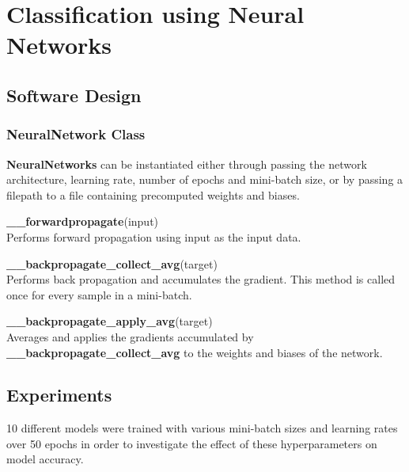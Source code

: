 \section{Classification using Neural Networks}

\subsection{Software Design}

\subsubsection*{NeuralNetwork Class}
\begin{list}{-}{}

    \item \textbf{NeuralNetworks} can be instantiated either through passing the
          network architecture, learning rate, number of epochs and mini-batch size,
          or by passing a filepath to a file containing precomputed weights and biases.

    \item \textbf{\_\_forwardpropagate}(input)\\
          Performs forward propagation using input as the input data.

    \item \textbf{\_\_backpropagate\_collect\_avg}(target)\\
          Performs back propagation and accumulates the gradient.
          This method is called once for every sample in a mini-batch.

    \item \textbf{\_\_backpropagate\_apply\_avg}(target)\\
          Averages and applies the gradients accumulated by
          \textbf{\_\_backpropagate\_collect\_avg} to the weights
          and biases of the network.
\end{list}



\subsection{Experiments}

10 different models were trained with various mini-batch sizes and
learning rates over 50 epochs in order to investigate the effect of
these hyperparameters on model accuracy.

